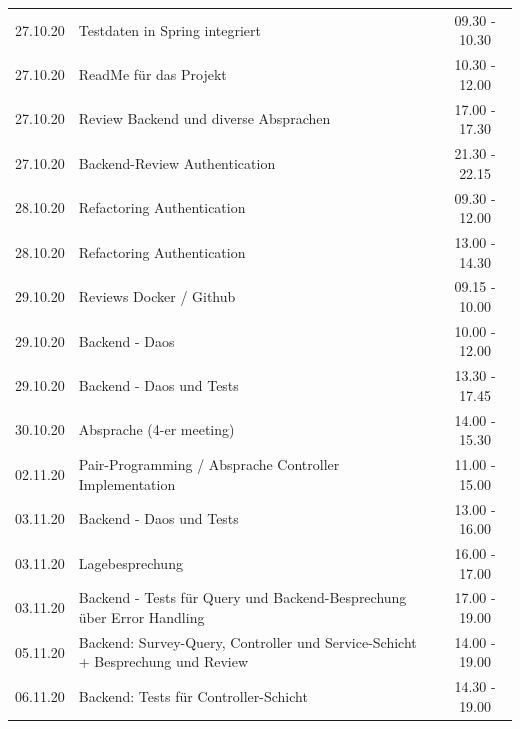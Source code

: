 \begin{longtable}{cp{}c}
    27.10.20 & Testdaten in Spring integriert                                                  & 09.30 - 10.30           \\
    27.10.20 & ReadMe für das Projekt                                                          & 10.30 - 12.00           \\
    27.10.20 & Review Backend und diverse Absprachen                                           & 17.00 - 17.30           \\
    27.10.20 & Backend-Review Authentication                                                   & 21.30 - 22.15           \\
    28.10.20 & Refactoring Authentication                                                      & 09.30 - 12.00           \\
    28.10.20 & Refactoring Authentication                                                      & 13.00 - 14.30           \\
    29.10.20 & Reviews Docker / Github                                                         & 09.15 - 10.00           \\
    29.10.20 & Backend - Daos                                                                  & 10.00 - 12.00           \\
    29.10.20 & Backend - Daos und Tests                                                        & 13.30 - 17.45           \\
    30.10.20 & Absprache (4-er meeting)                                                        & 14.00 - 15.30
    \\
    02.11.20 & Pair-Programming / Absprache Controller Implementation                          & 11.00 - 15.00           \\
    03.11.20 & Backend - Daos und Tests                                                        & 13.00 - 16.00           \\
    03.11.20 & Lagebesprechung                                                                 & 16.00 - 17.00           \\
    03.11.20 & Backend - Tests für Query und Backend-Besprechung über Error Handling           & 17.00 - 19.00           \\
    05.11.20 & Backend:  Survey-Query, Controller und Service-Schicht + Besprechung und Review & 14.00 - 19.00           \\
    06.11.20 & Backend: Tests für Controller-Schicht                                           & 14.30 - 19.00           \\

\end{longtable}
